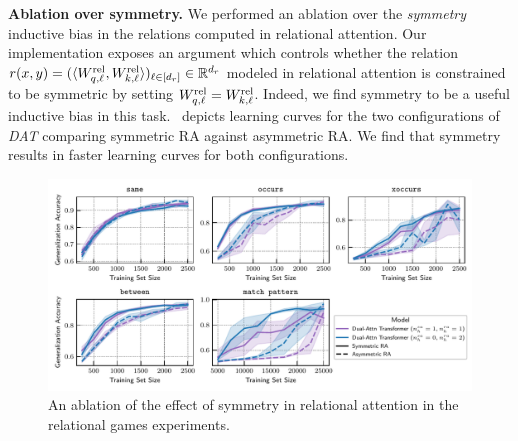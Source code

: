 \textbf{Ablation over symmetry.} We performed an ablation over the \textit{symmetry} inductive bias in the relations computed in relational attention. Our implementation exposes an argument which controls whether the relation $r(x, y) = (\langle W_{q, \ell}^{\mathrm{rel}}, W_{k, \ell}^{\mathrm{rel}} \rangle)_{\ell \in [d_r]} \in \mathbb{R}^{d_r}$ modeled in relational attention is constrained to be symmetric by setting $W_{q, \ell}^{\mathrm{rel}} = W_{k, \ell}^{\mathrm{rel}}$. Indeed, we find symmetry to be a useful inductive bias in this task.~ depicts learning curves for the two configurations of \textit{DAT} comparing symmetric RA against asymmetric RA. We find that symmetry results in faster learning curves for both configurations.


\begin{figure}[h]
    \centering
    \includegraphics[width=\textwidth]{figs/experiments/relgames/relgames_learning_curves_symmetry_ablation.pdf}
    \caption{An ablation of the effect of symmetry in relational attention in the relational games experiments.}\label{fig:relgames_symmetry_ablation}
\end{figure}


